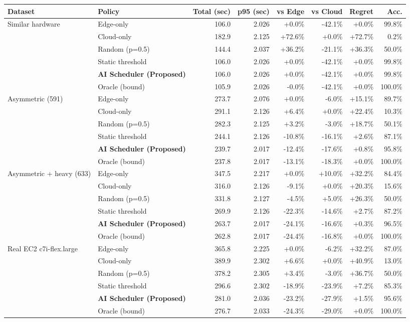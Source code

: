 \begin{tabular}{llrrrrrr}
\toprule
Dataset & Policy & Total (sec) & p95 (sec) & vs Edge & vs Cloud & Regret & Acc. \\
\midrule
Similar hardware & Edge-only & 106.0 & 2.026 & +0.0\% & -42.1\% & +0.0\% & 99.8\% \\
 & Cloud-only & 182.9 & 2.125 & +72.6\% & +0.0\% & +72.7\% & 0.2\% \\
 & Random (p=0.5) & 144.4 & 2.037 & +36.2\% & -21.1\% & +36.3\% & 50.0\% \\
 & Static threshold & 106.0 & 2.026 & +0.0\% & -42.1\% & +0.0\% & 99.8\% \\
 & \textbf{AI Scheduler (Proposed)} & 106.0 & 2.026 & +0.0\% & -42.1\% & +0.0\% & 99.8\% \\
 & Oracle (bound) & 105.9 & 2.026 & -0.0\% & -42.1\% & +0.0\% & 100.0\% \\
\midrule
Asymmetric (591) & Edge-only & 273.7 & 2.076 & +0.0\% & -6.0\% & +15.1\% & 89.7\% \\
 & Cloud-only & 291.1 & 2.126 & +6.4\% & +0.0\% & +22.4\% & 10.3\% \\
 & Random (p=0.5) & 282.3 & 2.125 & +3.2\% & -3.0\% & +18.7\% & 50.1\% \\
 & Static threshold & 244.1 & 2.126 & -10.8\% & -16.1\% & +2.6\% & 87.1\% \\
 & \textbf{AI Scheduler (Proposed)} & 239.7 & 2.017 & -12.4\% & -17.6\% & +0.8\% & 95.8\% \\
 & Oracle (bound) & 237.8 & 2.017 & -13.1\% & -18.3\% & +0.0\% & 100.0\% \\
\midrule
Asymmetric + heavy (633) & Edge-only & 347.5 & 2.217 & +0.0\% & +10.0\% & +32.2\% & 84.4\% \\
 & Cloud-only & 316.0 & 2.126 & -9.1\% & +0.0\% & +20.3\% & 15.6\% \\
 & Random (p=0.5) & 331.8 & 2.127 & -4.5\% & +5.0\% & +26.3\% & 50.0\% \\
 & Static threshold & 269.9 & 2.126 & -22.3\% & -14.6\% & +2.7\% & 87.2\% \\
 & \textbf{AI Scheduler (Proposed)} & 263.7 & 2.017 & -24.1\% & -16.6\% & +0.3\% & 96.5\% \\
 & Oracle (bound) & 262.8 & 2.017 & -24.4\% & -16.8\% & +0.0\% & 100.0\% \\
\midrule
Real EC2 c7i-flex.large & Edge-only & 365.8 & 2.225 & +0.0\% & -6.2\% & +32.2\% & 87.0\% \\
 & Cloud-only & 389.9 & 2.302 & +6.6\% & +0.0\% & +40.9\% & 13.0\% \\
 & Random (p=0.5) & 378.2 & 2.305 & +3.4\% & -3.0\% & +36.7\% & 50.0\% \\
 & Static threshold & 296.6 & 2.302 & -18.9\% & -23.9\% & +7.2\% & 85.3\% \\
 & \textbf{AI Scheduler (Proposed)} & 281.0 & 2.036 & -23.2\% & -27.9\% & +1.5\% & 95.6\% \\
 & Oracle (bound) & 276.7 & 2.033 & -24.3\% & -29.0\% & +0.0\% & 100.0\% \\
\bottomrule
\end{tabular}
